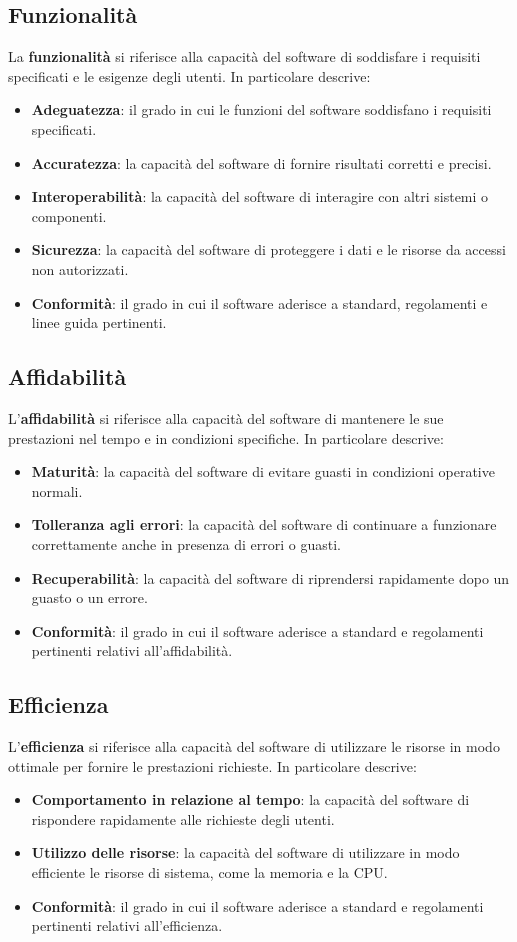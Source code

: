 \documentclass[a4paper, 11pt]{article}
\begin{document}
\subsection{Funzionalità}
La \textbf{funzionalità} si riferisce alla capacità del software di soddisfare i requisiti specificati e le esigenze degli utenti.
In particolare descrive:
\begin{itemize}
    \item \textbf{Adeguatezza}: il grado in cui le funzioni del software soddisfano i requisiti specificati.
    \item \textbf{Accuratezza}: la capacità del software di fornire risultati corretti e precisi.
    \item \textbf{Interoperabilità}: la capacità del software di interagire con altri sistemi o componenti.
    \item \textbf{Sicurezza}: la capacità del software di proteggere i dati e le risorse da accessi non autorizzati.
    \item \textbf{Conformità}: il grado in cui il software aderisce a standard, regolamenti e linee guida pertinenti.
\end{itemize}
\subsection{Affidabilità}
L'\textbf{affidabilità} si riferisce alla capacità del software di mantenere le sue prestazioni nel tempo e in condizioni specifiche.
In particolare descrive:
\begin{itemize}
    \item \textbf{Maturità}: la capacità del software di evitare guasti in condizioni operative normali.
    \item \textbf{Tolleranza agli errori}: la capacità del software di continuare a funzionare correttamente anche in presenza di errori o guasti.
    \item \textbf{Recuperabilità}: la capacità del software di riprendersi rapidamente dopo un guasto o un errore.
    \item \textbf{Conformità}: il grado in cui il software aderisce a standard e regolamenti pertinenti relativi all'affidabilità.
\end{itemize}
\subsection{Efficienza}
L'\textbf{efficienza} si riferisce alla capacità del software di utilizzare le risorse in modo ottimale per fornire le prestazioni richieste.
In particolare descrive:
\begin{itemize}
    \item \textbf{Comportamento in relazione al tempo}: la capacità del software di rispondere rapidamente alle richieste degli utenti.
    \item \textbf{Utilizzo delle risorse}: la capacità del software di utilizzare in modo efficiente le risorse di sistema, come la memoria e la CPU.
    \item \textbf{Conformità}: il grado in cui il software aderisce a standard e regolamenti pertinenti relativi all'efficienza.
\end{itemize}
\end{document}
